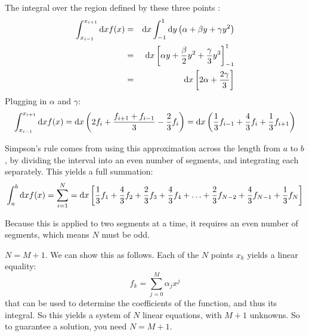 
\begin{answer}
The integral over the region defined by these three points :
\begin{eqnarray}
  \int_{x_{i-1}}^{x_{i+1}} {\rm d}x f(x) &=& {\rm d}x \int_{-1}^{1} {\rm
    d}y \left(\alpha + \beta y + \gamma y^2\right) \cr
  &=& {\rm d}x \left[\alpha y + \frac{\beta}{2} y^2 + \frac{\gamma}{3}
    y^3\right]_{-1}^{1}  \cr
  &=& {\rm d}x \left[2 \alpha + \frac{2\gamma}{3}\right]
\end{eqnarray}
Plugging in $\alpha$ and $\gamma$:
\begin{equation}
  \int_{x_{i-1}}^{x_{i+1}} {\rm d}x f(x)
  = {\rm d}x \left(2 f_i +
  \frac{f_{i+1} + f_{i-1}}{3} - \frac{2}{3} f_i\right) 
  = {\rm d}x \left(\frac{1}{3} f_{i-1}
  + \frac{4}{3} f_i 
  + \frac{1}{3} f_{i+1}\right)
\end{equation}
\end{answer}

Simpson's rule comes from using this approximation across the length
from $a$ to $b$, by dividing the interval into an even number of
segments, and integrating each separately. This yields a full
summation:
\begin{equation}
  \int_a^b {\rm d}x f(x) = \sum_{i=1}^N = {\rm d}x \left[\frac{1}{3}
    f_1 + \frac{4}{3} f_2 + \frac{2}{3} f_3 + \frac{4}{3} f_4 + \ldots
    + \frac{2}{3} f_{N-2} + \frac{4}{3} f_{N-1} + \frac{1}{3} f_N
    \right]
\end{equation}

Because this is applied to two segments at a time, it requires an even
number of segments, which means $N$ must be odd.


\begin{answer}
$N = M + 1$. We can show this as follows. Each of the $N$ points $x_k$
  yields a linear equality:
\begin{equation}
\label{eq:weights}
 f_k = \sum_{j=0}^M \alpha_j x^j
\end{equation}
that can be used to determine the coefficients of the function, and
thus its integral.  So this yields a system of $N$ linear equations,
with $M+1$ unknowns. So to guarantee a solution, you need $N=M+1$.
\end{answer}

